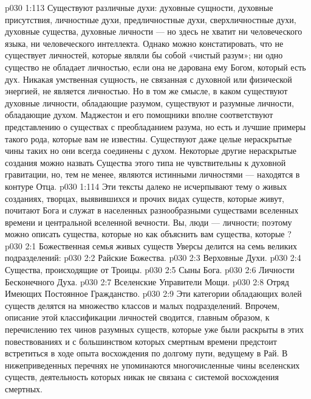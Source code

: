 \vs p030 1:113 Существуют различные духи: духовные сущности, духовные присутствия, личностные духи, предличностные духи, сверхличностные духи, духовные существа, духовные личности --- но здесь не хватит ни человеческого языка, ни человеческого интеллекта. Однако можно констатировать, что не существует личностей, которые являли бы собой «чистый разум»; ни одно существо не обладает личностью, если она не дарована ему Богом, который есть дух. Никакая умственная сущность, не связанная с духовной или физической энергией, не является личностью. Но в том же смысле, в каком существуют духовные личности, обладающие разумом, существуют и разумные личности, обладающие духом. Маджестон и его помощники вполне соответствуют представлению о существах с преобладанием разума, но есть и лучшие примеры такого рода, которые вам не известны. Существуют даже целые нераскрытые чины таких  но они всегда соединены с духом. Некоторые другие нераскрытые создания можно назвать  Существа этого типа не чувствительны к духовной гравитации, но, тем не менее, являются истинными личностями --- находятся в контуре Отца.
\vs p030 1:114 \pc Эти тексты далеко не исчерпывают тему о живых созданиях, творцах, выявившихся и прочих видах существ, которые живут, почитают Бога и служат в населенных разнообразными существами вселенных времени и центральной вселенной вечности. Вы, люди --- личности; поэтому можно описать существа, которые  но как объяснить вам существа, которые ?
\vs p030 2:1 Божественная семья живых существ Уверсы делится на семь великих подразделений:
\vs p030 2:2 \bibnobreakspace Райские Божества.
\vs p030 2:3 \bibnobreakspace Верховные Духи.
\vs p030 2:4 \bibnobreakspace Существа, происходящие от Троицы.
\vs p030 2:5 \bibnobreakspace Сыны Бога.
\vs p030 2:6 \bibnobreakspace Личности Бесконечного Духа.
\vs p030 2:7 \bibnobreakspace Вселенские Управители Мощи.
\vs p030 2:8 \bibnobreakspace Отряд Имеющих Постоянное Гражданство.
\vs p030 2:9 \pc Эти категории обладающих волей существ делятся на множество классов и малых подразделений. Впрочем, описание этой классификации личностей сводится, главным образом, к перечислению тех чинов разумных существ, которые уже были раскрыты в этих повествованиях и с большинством которых смертным времени предстоит встретиться в ходе опыта восхождения по долгому пути, ведущему в Рай. В нижеприведенных перечнях не упоминаются многочисленные чины вселенских существ, деятельность которых никак не связана с системой восхождения смертных.
